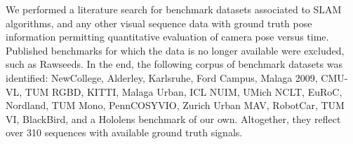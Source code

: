 We performed a literature search for benchmark datasets associated to SLAM
algorithms, and any other visual sequence data with ground truth pose
information permitting quantitative evaluation of camera pose versus time.
Published benchmarks for which the data is no longer
available were excluded, such as Rawseeds\cite{fontana2014rawseeds}.
In the end, the following corpus of benchmark datasets was identified:  
NewCollege\cite{smith2009new},				%
Alderley\cite{milford2012seqslam},			%
Karlsruhe\cite{Geiger2010ACCV}, 			%
Ford Campus\cite{pandey2011ford},			%
Malaga 2009\cite{malaga2009},				%
CMU-VL\cite{badino2011visual}, 			%
TUM RGBD\cite{sturm12iros_ws}, 				%
KITTI\cite{KITTI}, 							%
Malaga Urban\cite{blanco2014malaga},		%
ICL NUIM\cite{ICLNUIM}, 					%
UMich NCLT\cite{carlevaris2016university},	%
EuRoC\cite{burri2016euroc},				%
Nordland\cite{sunderhauf2013we},			%
TUM Mono\cite{engel2016monodataset},		%
PennCOSYVIO\cite{pfrommer2017penncosyvio}, %
Zurich Urban MAV\cite{majdik2017zurich}, 	%
RobotCar\cite{maddern20171},				%
TUM VI\cite{schubert2018vidataset},		%
BlackBird\cite{antonini2018blackbird}, 	%
and a Hololens benchmark of our own. 		%
Altogether, they
reflect over 310 sequences with available ground truth signals.

